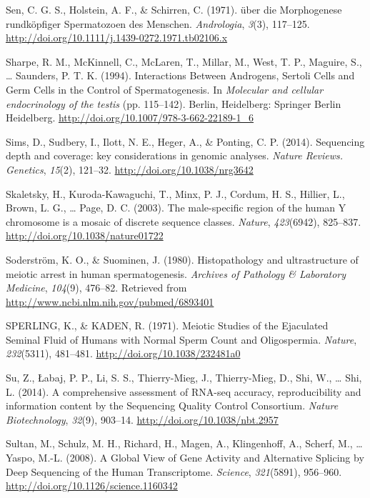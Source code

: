 \documentclass[12pt,twoside]{reedthesis}
\theoremstyle{definition}
\theoremstyle{definition}
\theoremstyle{remark}
\begin{document}
  \hypertarget{ref-Sen2009}{}
  Sen, C. G. S., Holstein, A. F., \& Schirren, C. (1971). über die
  Morphogenese rundköpfiger Spermatozoen des Menschen. \emph{Andrologia},
  \emph{3}(3), 117--125.
  \url{http://doi.org/10.1111/j.1439-0272.1971.tb02106.x}
  
  \hypertarget{ref-Sharpe1994}{}
  Sharpe, R. M., McKinnell, C., McLaren, T., Millar, M., West, T. P.,
  Maguire, S., \ldots{} Saunders, P. T. K. (1994). Interactions Between
  Androgens, Sertoli Cells and Germ Cells in the Control of
  Spermatogenesis. In \emph{Molecular and cellular endocrinology of the
  testis} (pp. 115--142). Berlin, Heidelberg: Springer Berlin Heidelberg.
  \url{http://doi.org/10.1007/978-3-662-22189-1_6}
  
  \hypertarget{ref-Sims2014}{}
  Sims, D., Sudbery, I., Ilott, N. E., Heger, A., \& Ponting, C. P.
  (2014). Sequencing depth and coverage: key considerations in genomic
  analyses. \emph{Nature Reviews. Genetics}, \emph{15}(2), 121--32.
  \url{http://doi.org/10.1038/nrg3642}
  
  \hypertarget{ref-Skaletsky2003}{}
  Skaletsky, H., Kuroda-Kawaguchi, T., Minx, P. J., Cordum, H. S.,
  Hillier, L., Brown, L. G., \ldots{} Page, D. C. (2003). The
  male-specific region of the human Y chromosome is a mosaic of discrete
  sequence classes. \emph{Nature}, \emph{423}(6942), 825--837.
  \url{http://doi.org/10.1038/nature01722}
  
  \hypertarget{ref-Soderstrom1980}{}
  Soderström, K. O., \& Suominen, J. (1980). Histopathology and
  ultrastructure of meiotic arrest in human spermatogenesis.
  \emph{Archives of Pathology \& Laboratory Medicine}, \emph{104}(9),
  476--82. Retrieved from \url{http://www.ncbi.nlm.nih.gov/pubmed/6893401}
  
  \hypertarget{ref-SPERLING1971}{}
  SPERLING, K., \& KADEN, R. (1971). Meiotic Studies of the Ejaculated
  Seminal Fluid of Humans with Normal Sperm Count and Oligospermia.
  \emph{Nature}, \emph{232}(5311), 481--481.
  \url{http://doi.org/10.1038/232481a0}
  
  \hypertarget{ref-Su2014}{}
  Su, Z., Łabaj, P. P., Li, S. S., Thierry-Mieg, J., Thierry-Mieg, D.,
  Shi, W., \ldots{} Shi, L. (2014). A comprehensive assessment of RNA-seq
  accuracy, reproducibility and information content by the Sequencing
  Quality Control Consortium. \emph{Nature Biotechnology}, \emph{32}(9),
  903--14. \url{http://doi.org/10.1038/nbt.2957}
  
  \hypertarget{ref-Sultan2008}{}
  Sultan, M., Schulz, M. H., Richard, H., Magen, A., Klingenhoff, A.,
  Scherf, M., \ldots{} Yaspo, M.-L. (2008). A Global View of Gene Activity
  and Alternative Splicing by Deep Sequencing of the Human Transcriptome.
  \emph{Science}, \emph{321}(5891), 956--960.
  \url{http://doi.org/10.1126/science.1160342}
  
\end{document}
